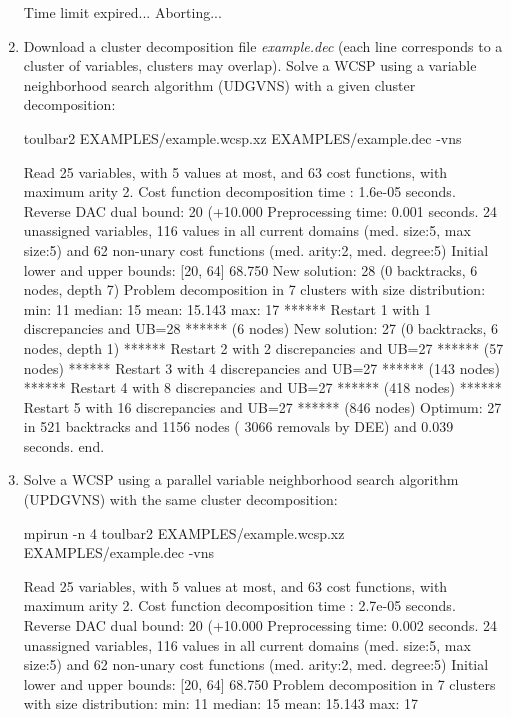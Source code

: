 \begin{enumerate}
{\begin{DoxyCode}
Time limit expired... Aborting...
\end{DoxyCode}}
\item Download a cluster decomposition file {\em example.dec} (each line corresponds to a cluster of variables, clusters may overlap). Solve a WCSP using a variable neighborhood search algorithm (UDGVNS) with a given cluster decomposition:
\begin{DoxyCode}
	toulbar2 EXAMPLES/example.wcsp.xz EXAMPLES/example.dec -vns
\end{DoxyCode}
{\scriptsize
\begin{DoxyCode}
Read 25 variables, with 5 values at most, and 63 cost functions, with maximum arity 2.
Cost function decomposition time : 1.6e-05 seconds.
Reverse DAC dual bound: 20 (+10.000%
Preprocessing time: 0.001 seconds.
24 unassigned variables, 116 values in all current domains (med. size:5, max size:5) and 62 non-unary cost functions (med. arity:2, med. degree:5)
Initial lower and upper bounds: [20, 64] 68.750%
New solution: 28 (0 backtracks, 6 nodes, depth 7)
Problem decomposition in 7 clusters with size distribution: min: 11 median: 15 mean: 15.143 max: 17
****** Restart 1 with 1 discrepancies and UB=28 ****** (6 nodes)
New solution: 27 (0 backtracks, 6 nodes, depth 1)
****** Restart 2 with 2 discrepancies and UB=27 ****** (57 nodes)
****** Restart 3 with 4 discrepancies and UB=27 ****** (143 nodes)
****** Restart 4 with 8 discrepancies and UB=27 ****** (418 nodes)
****** Restart 5 with 16 discrepancies and UB=27 ****** (846 nodes)
Optimum: 27 in 521 backtracks and 1156 nodes ( 3066 removals by DEE) and 0.039 seconds.
end.
\end{DoxyCode}}
\item Solve a WCSP using a parallel variable neighborhood search algorithm (UPDGVNS) with the same cluster decomposition:
\begin{DoxyCode}
	mpirun -n 4 toulbar2 EXAMPLES/example.wcsp.xz EXAMPLES/example.dec -vns
\end{DoxyCode}
{\scriptsize
\begin{DoxyCode}
Read 25 variables, with 5 values at most, and 63 cost functions, with maximum arity 2.
Cost function decomposition time : 2.7e-05 seconds.
Reverse DAC dual bound: 20 (+10.000%
Preprocessing time: 0.002 seconds.
24 unassigned variables, 116 values in all current domains (med. size:5, max size:5) and 62 non-unary cost functions (med. arity:2, med. degree:5)
Initial lower and upper bounds: [20, 64] 68.750%
Problem decomposition in 7 clusters with size distribution: min: 11 median: 15 mean: 15.143 max: 17

\end{DoxyCode}}
\end{enumerate}
